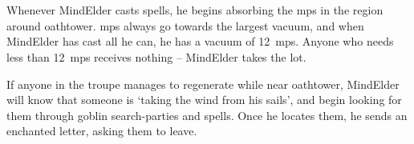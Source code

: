 
\section{}

Whenever \gls{MindElder} casts spells, he begins absorbing the \glspl{mp} in the \gls{region} around \gls{oathtower}.
\Glspl{mp} always go towards the largest vacuum, and when \gls{MindElder} has cast all he can, he has a vacuum of 12~\glspl{mp}.
Anyone who needs less than 12~\glspl{mp} receives nothing -- \gls{MindElder} takes the lot.

If anyone in the troupe manages to regenerate  while near \gls{oathtower}, \gls{MindElder} will know that someone is `taking the wind from his sails', and begin looking for them through goblin search-parties and spells.
Once he locates them, he sends an enchanted letter, asking them to leave.


